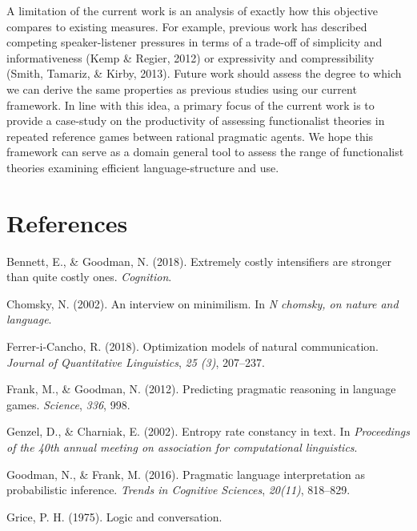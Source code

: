 \documentclass[10pt, letterpaper]{article}
\begin{document}
A limitation of the current work is an analysis of exactly how this
objective compares to existing measures. For example, previous work has
described competing speaker-listener pressures in terms of a trade-off
of simplicity and informativeness (Kemp \& Regier, 2012) or expressivity
and compressibility (Smith, Tamariz, \& Kirby, 2013). Future work should
assess the degree to which we can derive the same properties as previous
studies using our current framework. In line with this idea, a primary
focus of the current work is to provide a case-study on the productivity
of assessing functionalist theories in repeated reference games between
rational pragmatic agents. We hope this framework can serve as a domain
general tool to assess the range of functionalist theories examining
efficient language-structure and use.\par

\section{References}\label{references}

\setlength{\parindent}{-0.1in} \setlength{\leftskip}{0.125in} \noindent

\hypertarget{refs}{}
\hypertarget{ref-BennettGoodman2015a}{}
Bennett, E., \& Goodman, N. (2018). Extremely costly intensifiers are
stronger than quite costly ones. \emph{Cognition}.

\hypertarget{ref-Chomsky2002a}{}
Chomsky, N. (2002). An interview on minimilism. In \emph{N chomsky, on
nature and language}.

\hypertarget{ref-FerreriCancho2018a}{}
Ferrer-i-Cancho, R. (2018). Optimization models of natural
communication. \emph{Journal of Quantitative Linguistics}, \emph{25
(3)}, 207--237.

\hypertarget{ref-FrankGoodman2012a}{}
Frank, M., \& Goodman, N. (2012). Predicting pragmatic reasoning in
language games. \emph{Science}, \emph{336}, 998.

\hypertarget{ref-GenzelCharniak2002a}{}
Genzel, D., \& Charniak, E. (2002). Entropy rate constancy in text. In
\emph{Proceedings of the 40th annual meeting on association for
computational linguistics}.

\hypertarget{ref-GoodmanFrank2016a}{}
Goodman, N., \& Frank, M. (2016). Pragmatic language interpretation as
probabilistic inference. \emph{Trends in Cognitive Sciences},
\emph{20(11)}, 818--829.

\hypertarget{ref-Grice1975a}{}
Grice, P. H. (1975). Logic and conversation.
\end{document}
